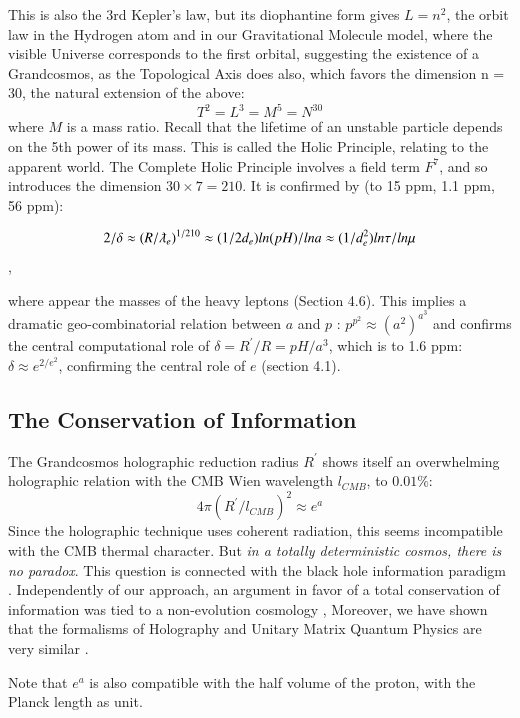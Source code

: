 \documentclass[twoside,draft]{article}
\begin{document}
\begin{sloppypar}
{This is also the 3rd Kepler's law, but its diophantine form gives $L = n^{2}$, the orbit law in the Hydrogen atom and in our
Gravitational Molecule model, where the visible Universe corresponds to the first orbital,
suggesting the existence of a Grandcosmos, as the Topological Axis does also, which favors the
dimension n = 30, the natural extension of the above:
\begin{equation}
T^{2} = L^{3} = M^{5} = N^{30}
\end{equation}
where $M$ is a mass ratio. Recall that the lifetime of an unstable particle depends on the 5th power of its mass. This is called the Holic Principle, relating to the apparent world. The Complete Holic
Principle involves a field term $F^{7}$, and so introduces the dimension $30 \times 7 = 210$. It is confirmed by (to 15 ppm, 1.1 ppm, 56 ppm):

$$2/\delta \approx (R/\lambdabar_{e})^{1/210} \approx (1/2d_{e}) ln(pH)/lna \approx (1/d_e^{2})ln\tau/ln\mu$$,

where appear the masses of the heavy leptons (Section 4.6). This implies a dramatic geo-combinatorial relation between $a$ and $p$ : $p^{p^{2}} \approx (a^{2})^{a^{3}}$ and confirms the central computational role of $\delta = R^{\prime}/R = pH/a^{3}$, which is to 1.6 ppm:$\delta \approx e^{2/e^2}$, confirming the central role of $e$ (section 4.1).


\subsection{The Conservation of Information}

The Grandcosmos holographic reduction radius $R^{\prime}$ shows itself an overwhelming holographic
relation with the CMB Wien wavelength $l_{CMB}$, to $0.01\%$:
\begin{equation}
4\pi(R^{\prime}/l_{CMB})^{2} \approx e^{a}
\end{equation}
Since the holographic technique uses coherent radiation, this seems incompatible with the CMB
thermal character. But \textit{in a totally deterministic cosmos, there is no paradox}. This question is
connected with the black hole information paradigm \cite{Preskill}. Independently of our approach, an
argument in favor of a total conservation of information was tied to a non-evolution cosmology
\cite{Nikolic}, Moreover, we have shown that the formalisms of Holography and Unitary Matrix Quantum
Physics are very similar \cite{Sanchez1}. 

Note that $e^{a}$ is also compatible with the half volume of the proton, with
the Planck length as unit.

}
\end{sloppypar}
\end{document}
